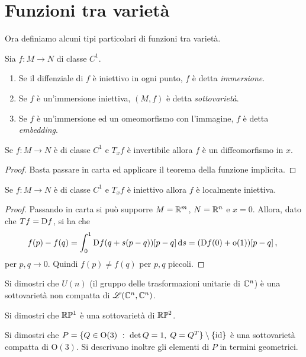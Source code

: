 \section{Funzioni tra varietà}
Ora definiamo alcuni tipi particolari di funzioni tra varietà.
 
\begin{definition}
	Sia $f:M\to N$ di classe $C^1$.
	\begin{enumerate}
	\item Se il diffenziale di $f$ è iniettivo in ogni punto, $f$ è detta \emph{immersione}. 
	\item Se $f$ è un'immersione iniettiva, $(M,f)$ è detta \emph{sottovarietà}. 
	\item Se $f$ è un'immersione ed un omeomorfismo con l'immagine, $f$ è detta \emph{embedding}. 
	\end{enumerate}
\end{definition}

\begin{proposition}
	Se $f:M\to N$ è di classe $C^1$ e $T_xf$ è invertibile allora $f$ è un diffeomorfismo in $x$.
\end{proposition}

 \begin{proof}
  Basta passare in carta ed applicare il teorema della funzione implicita.
 \end{proof}

\begin{proposition}
	Se $f:M\to N$ è di classe $C^1$ e $T_xf$ è iniettivo allora $f$ è localmente iniettiva.
\end{proposition}

\begin{proof}
	Passando in carta si può supporre $M=\mathbb R^m$, $N=\mathbb R^n$ e $x=0$. Allora, dato che $Tf=\mathrm D f$, si ha che
	\begin{equation*}
	f(p)-f(q)=\int_0^1\mathrm D f(q+s(p-q))[p-q]\,\mathrm d s=(\mathrm D f(0)+\mathrm{o}(1))[p-q]\, \text{, }
	\end{equation*}
	per $p,q\to 0$. Quindi $f(p)\ne f(q)$ per $p,q$ piccoli.
\end{proof}

\begin{exercise}
	Si dimostri che $U(n)$ (il gruppo delle trasformazioni unitarie di $\mathbb C^n$) è una sottovarietà non compatta di $\mathscr L(\mathbb C^n,\mathbb C^n)$.
\end{exercise}
\begin{exercise}
	Si dimostri che $\mathbb R \mathbb P^1$ è una sottovarietà di $\mathbb R \mathbb P^2$.
\end{exercise}
\begin{exercise}
	Si dimostri che $P=\{ Q\in \mathrm O(3)\ :\ \det Q=1,\; Q=Q^T\}\setminus\{\id\}$ è una sottovarietà compatta di $\mathrm O(3)$. Si descrivano inoltre gli elementi di $P$ in termini geometrici.
\end{exercise}